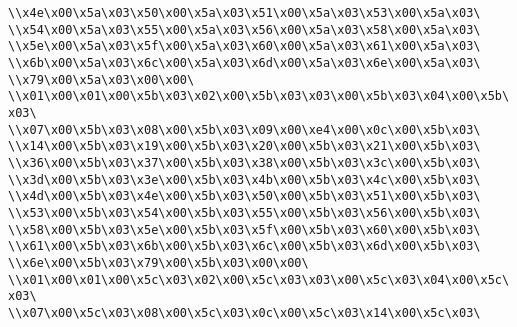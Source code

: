 \verb|\\x4e\x00\x5a\x03\x50\x00\x5a\x03\x51\x00\x5a\x03\x53\x00\x5a\x03\|\newline
\verb|\\x54\x00\x5a\x03\x55\x00\x5a\x03\x56\x00\x5a\x03\x58\x00\x5a\x03\|\newline
\verb|\\x5e\x00\x5a\x03\x5f\x00\x5a\x03\x60\x00\x5a\x03\x61\x00\x5a\x03\|\newline
\verb|\\x6b\x00\x5a\x03\x6c\x00\x5a\x03\x6d\x00\x5a\x03\x6e\x00\x5a\x03\|\newline
\verb|\\x79\x00\x5a\x03\x00\x00\|\newline
\verb|\\x01\x00\x01\x00\x5b\x03\x02\x00\x5b\x03\x03\x00\x5b\x03\x04\x00\x5b\x03\|\newline
\verb|\\x07\x00\x5b\x03\x08\x00\x5b\x03\x09\x00\xe4\x00\x0c\x00\x5b\x03\|\newline
\verb|\\x14\x00\x5b\x03\x19\x00\x5b\x03\x20\x00\x5b\x03\x21\x00\x5b\x03\|\newline
\verb|\\x36\x00\x5b\x03\x37\x00\x5b\x03\x38\x00\x5b\x03\x3c\x00\x5b\x03\|\newline
\verb|\\x3d\x00\x5b\x03\x3e\x00\x5b\x03\x4b\x00\x5b\x03\x4c\x00\x5b\x03\|\newline
\verb|\\x4d\x00\x5b\x03\x4e\x00\x5b\x03\x50\x00\x5b\x03\x51\x00\x5b\x03\|\newline
\verb|\\x53\x00\x5b\x03\x54\x00\x5b\x03\x55\x00\x5b\x03\x56\x00\x5b\x03\|\newline
\verb|\\x58\x00\x5b\x03\x5e\x00\x5b\x03\x5f\x00\x5b\x03\x60\x00\x5b\x03\|\newline
\verb|\\x61\x00\x5b\x03\x6b\x00\x5b\x03\x6c\x00\x5b\x03\x6d\x00\x5b\x03\|\newline
\verb|\\x6e\x00\x5b\x03\x79\x00\x5b\x03\x00\x00\|\newline
\verb|\\x01\x00\x01\x00\x5c\x03\x02\x00\x5c\x03\x03\x00\x5c\x03\x04\x00\x5c\x03\|\newline
\verb|\\x07\x00\x5c\x03\x08\x00\x5c\x03\x0c\x00\x5c\x03\x14\x00\x5c\x03\|\newline
